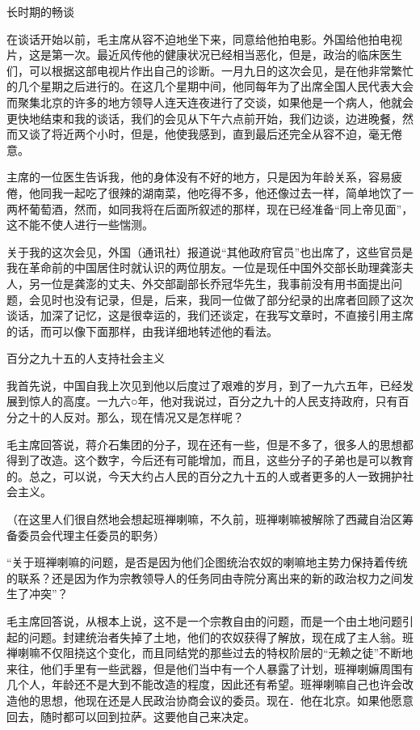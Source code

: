 长时期的畅谈

在谈话开始以前，毛主席从容不迫地坐下来，同意给他拍电影。外国给他拍电视片，这是第一次。最近风传他的健康状况已经相当恶化，但是，政治的临床医生们，可以根据这部电视片作出自己的诊断。一月九日的这次会见，是在他非常繁忙的几个星期之后进行的。在这几个星期中间，他同每年为了出席全国人民代表大会而聚集北京的许多的地方领导人连天连夜进行了交谈，如果他是一个病人，他就会更快地结束和我的谈话，我们的会见从下午六点前开始，我们边谈，边进晚餐，然而又谈了将近两个小时，但是，他使我感到，直到最后还完全从容不迫，毫无倦意。

主席的一位医生告诉我，他的身体没有不好的地方，只是因为年龄关系，容易疲倦，他同我一起吃了很辣的湖南菜，他吃得不多，他还像过去一样，简单地饮了一两杯葡萄酒，然而，如同我将在后面所叙述的那样，现在已经准备“同上帝见面”，这不能不使人进行一些惴测。

关于我的这次会见，外国（通讯社）报道说“其他政府官员”也出席了，这些官员是我在革命前的中国居住时就认识的两位朋友。一位是现任中国外交部长助理龚澎夫人，另一位是龚澎的丈夫、外交部副部长乔冠华先生，我事前没有用书面提出问题，会见时也没有记录，但是，后来，我同一位做了部分纪录的出席者回顾了这次谈话，加深了记忆，这是很幸运的，我们还谈定，在我写文章时，不直接引用主席的话，而可以像下面那样，由我详细地转述他的看法。

百分之九十五的人支持社会主义

我首先说，中国自我上次见到他以后度过了艰难的岁月，到了一九六五年，已经发展到惊人的高度。一九六○年，他对我说过，百分之九十的人民支持政府，只有百分之十的人反对。那么，现在情况又是怎样呢？

毛主席回答说，蒋介石集团的分子，现在还有一些，但是不多了，很多人的思想都得到了改造。这个数字，今后还有可能增加，而且，这些分子的子弟也是可以教育的。总之，可以说，今天大约占人民的百分之九十五的人或者更多的人一致拥护社会主义。

（在这里人们很自然地会想起班禅喇嘛，不久前，班禅喇嘛被解除了西藏自治区筹备委员会代理主任委员的职务）

“关于班禅喇嘛的问题，是否是因为他们企图统治农奴的喇嘛地主势力保持着传统的联系？还是因为作为宗教领导人的任务同由寺院分离出来的新的政治权力之间发生了冲突”？

毛主席回答说，从根本上说，这不是一个宗教自由的问题，而是一个由土地问题引起的问题。封建统治者失掉了土地，他们的农奴获得了解放，现在成了主人翁。班禅喇嘛不仅阻挠这个变化，而且同结党的那些过去的特权阶层的“无赖之徒”不断地来往，他们手里有一些武器，但是他们当中有一个人暴露了计划，班禅喇嫲周围有几个人，年龄还不是大到不能改造的程度，因此还有希望。班禅喇嘛自己也许会改造他的思想，他现在还是人民政治协商会议的委员。现在．他在北京。如果他愿意回去，随时都可以回到拉萨。这要他自己来决定。

